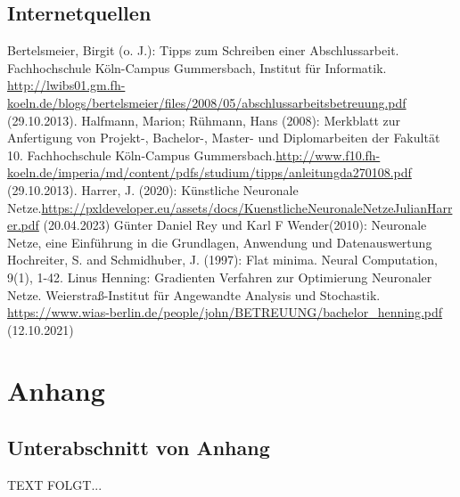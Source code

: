 \documentclass[a4paper,12pt,oneside]{article}
\begin{document}
    \subsection{Internetquellen}
    \begin{thebibliography}{HR08} %
      Bertelsmeier, Birgit (o. J.): Tipps zum Schrei\-b\-en ei\-n\-er Ab\-sch\-luss\-ar\-beit. Fach\-hoch\-schu\-le Köln-Campus Gummersbach, Institut für Informatik. \url{http://lwibs01.gm.fh-koeln.de/blogs/bertelsmeier/files/2008/05/abschlussarbeitsbetreuung.pdf} (29.10.2013).
       Halfmann, Marion; Rühmann, Hans (2008): Merkblatt zur Anfertigung von Projekt-, Bachelor-, Master- und Diplomarbeiten der Fakultät 10. Fachhochschule Köln-Campus Gummersbach.\url{http://www.f10.fh-koeln.de/imperia/md/content/pdfs/studium/tipps/anleitungda270108.pdf} (29.10.2013).
       Harrer, J. (2020): Künstliche Neuronale Netze.\url{https://pxldeveloper.eu/assets/docs/KuenstlicheNeuronaleNetzeJulianHarrer.pdf} (20.04.2023)
       Günter Daniel Rey und Karl F Wender(2010): Neuronale Netze, eine Einführung in die Grundlagen, Anwendung und Datenauswertung
       Hochreiter, S. and Schmidhuber, J. (1997): Flat minima. Neural Computation, 9(1), 1-42.
       Linus Henning: Gradienten Verfahren zur Optimierung Neuronaler Netze. Weierstraß-Institut für Angewandte Analysis und Stochastik. \url{https://www.wias-berlin.de/people/john/BETREUUNG/bachelor_henning.pdf} (12.10.2021)
    \end{thebibliography} 
  

  \newpage
  \setcounter{section}{0} %
  \renewcommand*\thesection{\Alph{section}} %
  \section{Anhang}\label{anhang}
    \subsection{Unterabschnitt von Anhang}\label{subsec_UabsAnhang}
    TEXT FOLGT...
  
\end{document}
